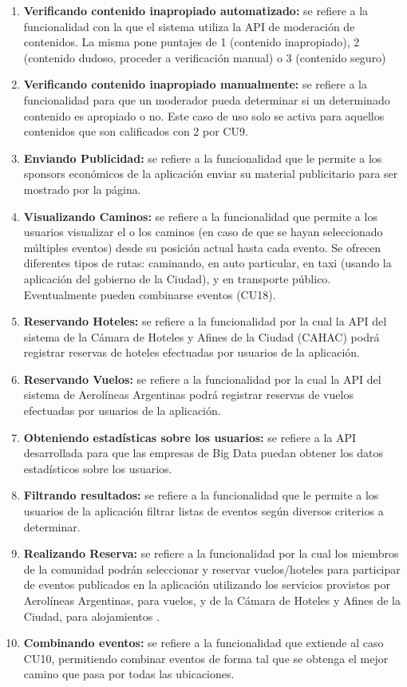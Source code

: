 \begin{enumerate}
  \item \textbf{Verificando contenido inapropiado automatizado:} se refiere a la funcionalidad con la que el sistema utiliza la API de moderación de contenidos. La misma pone puntajes de 1 (contenido inapropiado), 2 (contenido dudoso, proceder a verificación manual) o 3 (contenido seguro)
  \item \textbf{Verificando contenido inapropiado manualmente:} se refiere a la funcionalidad para que un moderador pueda determinar si un determinado contenido es apropiado o no. Este caso de uso solo se activa para aquellos contenidos que son calificados con 2 por CU9.
  \item \textbf{Enviando Publicidad:} se refiere a la funcionalidad que le permite a los sponsors económicos de la aplicación enviar su material publicitario para ser mostrado por la página.
  \item \textbf{Visualizando Caminos:} se refiere a la funcionalidad que permite a los usuarios visualizar el o los caminos (en caso de que se hayan seleccionado múltiples eventos) desde su posición actual hasta cada evento. Se ofrecen diferentes tipos de rutas: caminando, en auto particular, en taxi (usando la aplicación del gobierno de la Ciudad), y en transporte público. Eventualmente pueden combinarse eventos (CU18).
  \item \textbf{Reservando Hoteles:} se refiere a la funcionalidad por la cual la API del sistema de la Cámara de Hoteles y Afines de la Ciudad (CAHAC) podrá registrar reservas de hoteles efectuadas por usuarios de la aplicación.
  \item \textbf{Reservando Vuelos:} se refiere a la funcionalidad por la cual la API del sistema de Aerolíneas Argentinas podrá registrar reservas de vuelos efectuadas por usuarios de la aplicación.
  \item  \textbf{Obteniendo estadísticas sobre los usuarios:} se refiere a la API desarrollada para que las empresas de Big Data puedan obtener los datos estadísticos sobre los usuarios.
  \item  \textbf{Filtrando resultados:} se refiere a la funcionalidad que le permite a los usuarios de la aplicación filtrar listas de eventos según diversos criterios a determinar.
  \item  \textbf{Realizando Reserva:} se refiere a la funcionalidad por la cual los miembros de la comunidad podrán seleccionar y reservar vuelos/hoteles para participar de eventos publicados en la aplicación utilizando los servicios provistos por Aerolíneas Argentinas, para vuelos, y de la Cámara de Hoteles y Afines de la Ciudad, para alojamientos .
  \item \textbf{Combinando eventos:}  se refiere a la funcionalidad que extiende al caso CU10, permitiendo combinar eventos de forma tal que se obtenga el mejor camino que pasa por todas las ubicaciones.
\end{enumerate}

